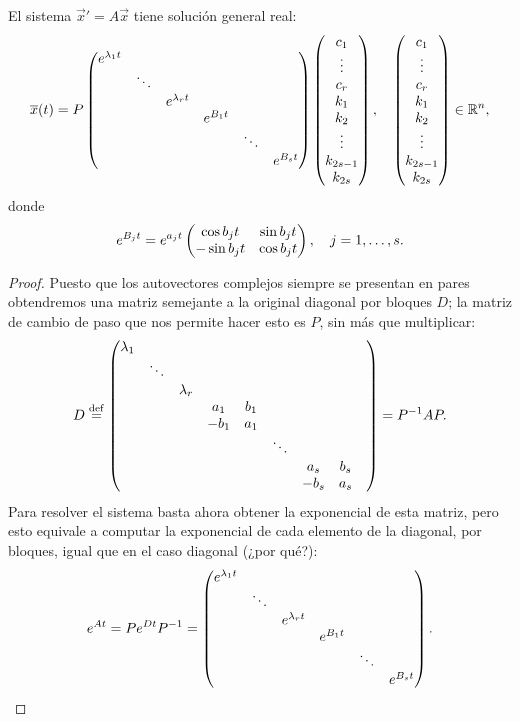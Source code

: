 \documentclass[../ecuaciones_diferenciales.tex]{subfiles}
\begin{document}
\begin{theorem}
	El sistema \(\vec{x}' = A\vec{x}\) tiene solución general real:
	\[\overline{x}(t) = P
		\begin{pmatrix}e^{\lambda_1 t} & & & & & \\
			& \ddots & & & & \\
			& & e^{\lambda_r t} & & & \\
			& & & e^{B_1 t} & & \\
			& & & & \ddots & \\
			& & & & & e^{B_s t}\end{pmatrix}
		\begin{pmatrix}c_1 \\ \vdots \\ c_r \\ k_1 \\ k_2 \\ \vdots \\ k_{2s-1}\\ k_{2s}\end{pmatrix},
		\quad 
		\begin{pmatrix}c_1 \\ \vdots \\ c_r \\ k_1 \\ k_2 \\ \vdots \\ k_{2s-1}\\ k_{2s}\end{pmatrix}
		\in \mathbb{R}^n,\]
	donde
	\[e^{B_j t} = e^{a_j t} \begin{pmatrix}\cos b_j t & \sin b_j t \\
		-\sin b_j t & \cos b_j t\end{pmatrix}, 
		\quad 
		j = 1, \dots, s.\]
\end{theorem}

\begin{proof}
	Puesto que los autovectores complejos siempre se presentan en
	pares obtendremos una matriz semejante a la original diagonal por bloques
	\(D\); la matriz de cambio de paso que nos permite hacer esto es \(P\), 
	sin más que multiplicar:
	\[D \overset{\operatorname{def}}{=} \begin{pmatrix}\lambda_1 & & & & & & & \\
		& \ddots & & & & & & \\
		& & \lambda_r & & & & & \\
		& & & a_1 & b_1 & & & & \\
		& & & -b_1 & a_1 & & & & \\
		& & & & & \ddots & & \\
		& & & & & & a_s & b_s \\
		& & & & & & -b_s & a_s\end{pmatrix} = P^{-1}AP.\]
	Para resolver el sistema basta ahora obtener la exponencial de esta matriz,
	pero esto equivale a computar la exponencial de cada elemento de la diagonal,
	por bloques, igual que en el caso diagonal (¿por qué?):
	\[e^{A t} = P e^{D t} P^{-1} =
		\begin{pmatrix}e^{\lambda_1 t} & & & & & \\
			& \ddots & & & & \\
			& & e^{\lambda_r t} & & & \\
			& & & e^{B_1 t} & & \\
			& & & & \ddots & \\
			& & & & & e^{B_s t}\end{pmatrix}.\]
\end{proof}
\end{document}
